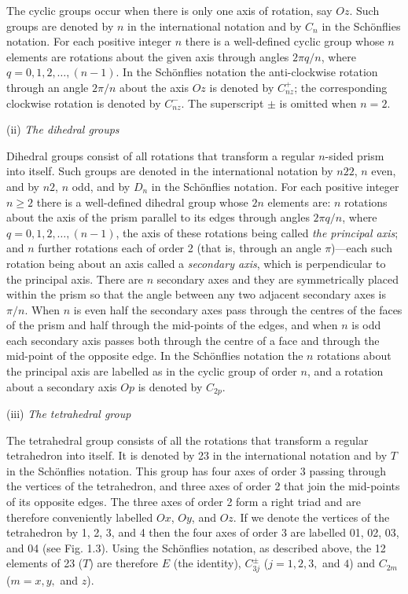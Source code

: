 \documentclass[11pt,a4paper,twoside,openright]{book}
\begin{document}
The cyclic groups occur when there is only one axis of rotation, say $Oz$. Such groups are denoted by $n$ in the international notation and by $C_{n}$ in the Schönflies notation. For each positive integer $n$ there is a well-defined cyclic group whose $n$ elements are rotations about the given axis through angles $2\pi q/n$, where $q = 0, 1, 2, \ldots, (n-1)$. In the Schönflies notation the anti-clockwise rotation through an angle $2\pi/n$ about the axis $Oz$ is denoted by $C_{nz}^{+}$; the corresponding clockwise rotation is denoted by $C_{nz}^{-}$. The superscript $\pm$ is omitted when $n = 2$.

(ii) \textit{The dihedral groups}

Dihedral groups consist of all rotations that transform a regular $n$-sided prism into itself. Such groups are denoted in the international notation by $n22$, $n$ even, and by $n2$, $n$ odd, and by $D_{n}$ in the Schönflies notation. For each positive integer $n \geqslant 2$ there is a well-defined dihedral group whose $2n$ elements are: $n$ rotations about the axis of the prism parallel to its edges through angles $2\pi q/n$, where $q = 0, 1, 2, \ldots, (n-1)$, the axis of these rotations being called \textit{the principal axis}; and $n$ further rotations each of order 2 (that is, through an angle $\pi$)—each such rotation being about an axis called a \textit{secondary axis}, which is perpendicular to the principal axis. There are $n$ secondary axes and they are symmetrically placed within the prism so that the angle between any two adjacent secondary axes is $\pi/n$. When $n$ is even half the secondary axes pass through the centres of the faces of the prism and half through the mid-points of the edges, and when $n$ is odd each secondary axis passes both through the centre of a face and through the mid-point of the opposite edge. In the Schönflies notation the $n$ rotations about the principal axis are labelled as in the cyclic group of order $n$, and a rotation about a secondary axis $Op$ is denoted by $C_{2p}$.

(iii) \textit{The tetrahedral group}

The tetrahedral group consists of all the rotations that transform a regular tetrahedron into itself. It is denoted by 23 in the international notation and by $T$ in the Schönflies notation. This group has four axes of order 3 passing through the vertices of the tetrahedron, and three axes of order 2 that join the mid-points of its opposite edges. The three axes of order 2 form a right triad and are therefore conveniently labelled $Ox$, $Oy$, and $Oz$. If we denote the vertices of the tetrahedron by 1, 2, 3, and 4 then the four axes of order 3 are labelled 01, 02, 03, and 04 (see Fig. 1.3). Using the Schönflies notation, as described above, the 12 elements of 23 ($T$) are therefore $E$ (the identity), $C_{3j}^{\pm}$ ($j = 1, 2, 3,$ and $4$) and $C_{2m}$ ($m = x, y,$ and $z$).
\end{document}
